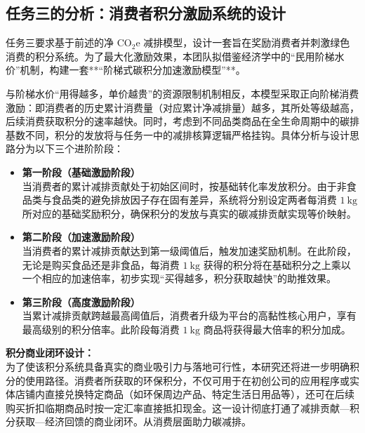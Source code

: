 \documentclass{article}
\begin{document}
\subsection{任务三的分析：消费者积分激励系统的设计}

任务三要求基于前述的净 $\mathrm{CO}_2\mathrm{e}$ 减排模型，设计一套旨在奖励消费者并刺激绿色消费的积分系统。为了最大化激励效果，本团队拟借鉴经济学中的“民用阶梯水价”机制，构建一套**“阶梯式碳积分加速激励模型”**。

与阶梯水价“用得越多，单价越贵”的资源限制机制相反，本模型采取正向阶梯消费激励：即消费者的历史累计消费量（对应累计净减排量）越多，其所处等级越高，后续消费获取积分的速率越快。同时，考虑到不同品类商品在全生命周期中的碳排基数不同，积分的发放将与任务一中的减排核算逻辑严格挂钩。具体分析与设计思路分为以下三个进阶阶段：

\begin{itemize}
    \item \textbf{第一阶段（基础激励阶段）} \\
    当消费者的累计减排贡献处于初始区间时，按基础转化率发放积分。由于非食品类与食品类的避免排放因子存在固有差异，系统将分别设定两者每消费 $1\ \mathrm{kg}$ 所对应的基础奖励积分，确保积分的发放与真实的碳减排贡献实现等价映射。
    
    \item \textbf{第二阶段（加速激励阶段）} \\
    当消费者的累计减排贡献达到第一级阈值后，触发加速奖励机制。在此阶段，无论是购买食品还是非食品，每消费 $1\ \mathrm{kg}$ 获得的积分将在基础积分之上乘以一个相应的加速倍率，初步实现“买得越多，积分获取越快”的助推效果。
    
    \item \textbf{第三阶段（高度激励阶段）} \\
    当累计减排贡献跨越最高阈值后，消费者升级为平台的高黏性核心用户，享有最高级别的积分倍率。此阶段每消费 $1\ \mathrm{kg}$ 商品将获得最大倍率的积分加成。
\end{itemize}

\textbf{积分商业闭环设计：} \\
为了使该积分系统具备真实的商业吸引力与落地可行性，本研究还将进一步明确积分的使用路径。消费者所获取的环保积分，不仅可用于在初创公司的应用程序或实体店铺内直接兑换特定商品（如环保周边产品、特定生活日用品等），还可在后续购买折扣临期商品时按一定汇率直接抵扣现金。这一设计彻底打通了减排贡献—积分获取—经济回馈的商业闭环。从消费层面助力碳减排。
\end{document}
